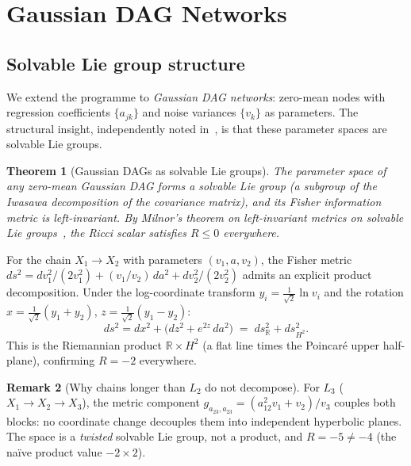 \documentclass[11pt]{article}
\newtheorem{theorem}{Theorem}[section]
\theoremstyle{definition}
\newtheorem{remark}[theorem]{Remark}
\begin{document}
\section{Gaussian DAG Networks}\label{sec:gaussian}

\subsection{Solvable Lie group structure}

We extend the programme to \emph{Gaussian DAG networks}: zero-mean nodes 
with regression coefficients $\{a_{jk}\}$ and noise variances $\{v_k\}$ 
as parameters.  The structural insight, independently noted in~\cite{gem4}, 
is that these parameter spaces are solvable Lie groups.

\begin{theorem}[Gaussian DAGs as solvable Lie groups]\label{thm:lie_group}
The parameter space of any zero-mean Gaussian DAG forms a solvable Lie group 
(a subgroup of the Iwasawa decomposition of the covariance matrix), and its 
Fisher information metric is left-invariant.  By Milnor's theorem on 
left-invariant metrics on solvable Lie groups~\cite{Mil76}, the Ricci scalar 
satisfies $R \leq 0$ everywhere.
\end{theorem}

For the chain $X_1 \to X_2$ with parameters $(v_1, a, v_2)$, the Fisher 
metric $ds^2 = dv_1^2/(2v_1^2) + (v_1/v_2)\,da^2 + dv_2^2/(2v_2^2)$ 
admits an explicit product decomposition.  Under the log-coordinate 
transform $y_i = \tfrac{1}{\sqrt{2}}\ln v_i$ and the rotation 
$x = \tfrac{1}{\sqrt{2}}(y_1+y_2)$, $z = \tfrac{1}{\sqrt{2}}(y_1-y_2)$:
\begin{equation}\label{eq:RxH2}
  ds^2 = dx^2 + \bigl(dz^2 + e^{2z}\,da^2\bigr) \;=\; ds^2_{\mathbb{R}} + ds^2_{H^2}.
\end{equation}
This is the Riemannian product $\mathbb{R} \times H^2$ (a flat line times 
the Poincar\'e upper half-plane), confirming $R = -2$ everywhere.

\begin{remark}[Why chains longer than $L_2$ do not decompose]
For $L_3$ ($X_1\to X_2\to X_3$), the metric component 
$g_{a_{23},a_{23}} = (a_{12}^2 v_1 + v_2)/v_3$ couples both blocks: 
no coordinate change decouples them into independent hyperbolic planes.  
The space is a \emph{twisted} solvable Lie group, not a product, 
and $R = -5 \neq -4$ (the na\"ive product value $-2 \times 2$).
\end{remark}
\end{document}
